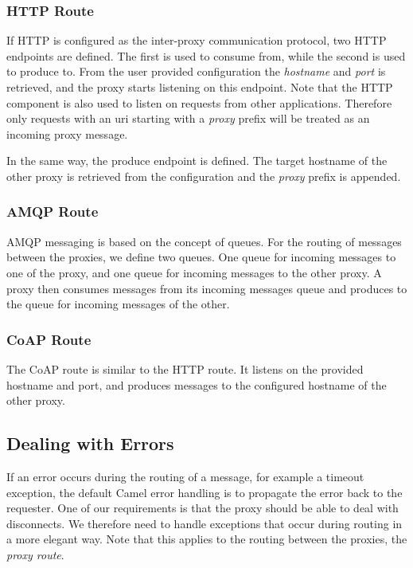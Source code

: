 \subsubsection{HTTP Route}

If HTTP is configured as the inter-proxy communication protocol, two HTTP
endpoints are defined. The first is used to consume from, while the second is
used to produce to. From the user provided configuration the \textit{hostname}
and \textit{port} is retrieved, and the proxy starts listening on this endpoint.
Note that the HTTP component is also used to listen on requests from other
applications. Therefore only requests with an \gls{uri} starting with a
\textit{proxy} prefix will be treated as an incoming proxy message.

In the same way, the produce endpoint is defined. The target hostname of the
other proxy is retrieved from the configuration and the \textit{proxy} prefix
is appended.

\subsubsection{AMQP Route}

AMQP messaging is based on the concept of queues. For the routing of messages
 between the proxies, we define two queues.
 One queue for incoming messages to one of the proxy,
 and one queue for incoming messages to the other proxy.
 A proxy then consumes messages from its incoming messages queue
 and produces to the queue for incoming messages of the other.

\subsubsection{CoAP Route}

The CoAP route is similar to the HTTP route. It listens on the provided hostname
and port, and produces messages to the configured hostname of the other proxy.


\subsection{Dealing with Errors}

If an error occurs during the routing of a message, for example a timeout
exception, the default Camel error handling is to propagate the error back to
the requester. One of our requirements is that the proxy should be able to deal
with disconnects. We therefore need to handle exceptions that occur during
routing in a more elegant way. Note that this applies to the routing between the
proxies, the \textit{proxy route}.

